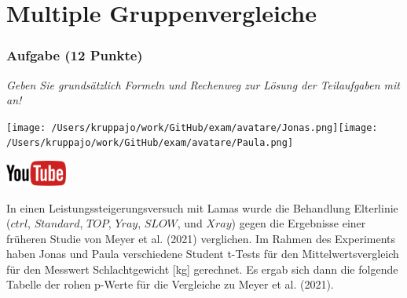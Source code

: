 \documentclass[a4paper, 9pt]{scrartcl}\usepackage[]{graphicx}\usepackage[]{xcolor}
\begin{document}
 
\clearpage
\part{Multiple Gruppenvergleiche}

\section{Aufgabe \hfill (12 Punkte)}

\textit{Geben Sie grundsätzlich Formeln und Rechenweg zur Lösung der Teilaufgaben mit an!} \\[1Ex]
 

 
\begin{minipage}[t]{0.5\textwidth}
\texttt{[image: /Users/kruppajo/work/GitHub/exam/avatare/Jonas.png]}\hspace{-4mm}\texttt{[image: /Users/kruppajo/work/GitHub/exam/avatare/Paula.png]}
\end{minipage}
\begin{minipage}[t]{0.5\textwidth}
\hfill
\href{https://youtu.be/kHmfEmU6lrk}{\includegraphics[width = 2cm]{img/youtube}}
\end{minipage}
\vspace{1ex}



In einen Leistungssteigerungsversuch mit Lamas wurde die Behandlung Elterlinie ($ctrl$, $Standard$, $TOP$, $Yray$, $SLOW$, und $Xray$) gegen die Ergebnisse einer früheren Studie von Meyer et al. (2021) verglichen. Im Rahmen des Experiments haben Jonas und Paula verschiedene Student t-Tests für den Mittelwertsvergleich für den Messwert Schlachtgewicht [kg] gerechnet. Es ergab sich dann die folgende Tabelle der rohen p-Werte für die Vergleiche zu Meyer et al. (2021).
\end{document}
